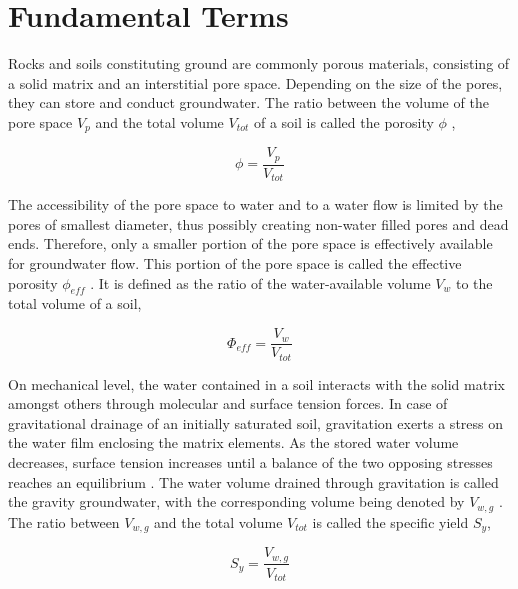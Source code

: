


\section{Fundamental Terms}
\label{Sec-TheoFundTerms}

Rocks and soils constituting ground are commonly porous materials, consisting of a solid matrix and an interstitial pore space. 
Depending on the size of the pores, they can store and conduct groundwater. 
The ratio between the volume of the pore space $V_p$ and the total volume $V_{tot}$ of a soil is called the porosity $\phi$ \parencite{Fetter.2001},

\begin{equation}
    \label{Eq-Porosity}
    \phi = \frac{V_p}{V_{tot}}
\end{equation}

The accessibility of the pore space to water and to a water flow is limited by the pores of smallest diameter, thus possibly creating non-water filled pores and dead ends. 
Therefore, only a smaller portion of the pore space is effectively available for groundwater flow. 
This portion of the pore space is called the effective porosity $\phi_{eff}$ \parencite{Fetter.2001}. 
It is defined as the ratio of the water-available volume $V_w$ to the total volume of a soil,

\begin{equation}
    \label{Eq-PorEff}
    \Phi_{eff} = \frac{V_w}{V_{tot}}
\end{equation}

On mechanical level, the water contained in a soil interacts with the solid matrix amongst others through molecular and surface tension forces. 
In case of gravitational drainage of an initially saturated soil, gravitation exerts a stress on the water film enclosing the matrix elements. 
As the stored water volume decreases, surface tension increases until a balance of the two opposing stresses reaches an equilibrium \parencite{Fetter.2001}. 
The water volume drained through gravitation is called the gravity groundwater, with the corresponding volume being denoted by $V_{w,g}$ \parencite{Johnson.1967}. 
The ratio between $V_{w,g}$ and the total volume $V_{tot}$ is called the specific yield $S_y$,

\begin{equation}
    \label{Eq-Sy}
    S_y = \frac{V_{w,g}}{V_{tot}}
\end{equation}

